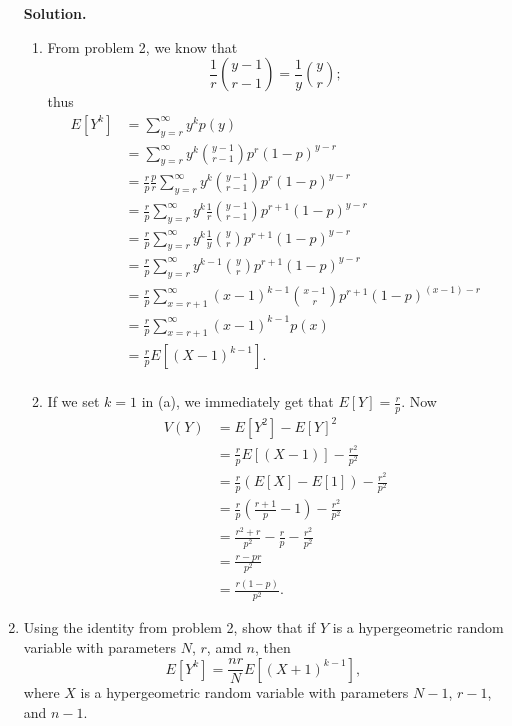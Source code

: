 \documentclass[9pt]{article}
\newcommand{\D}{\displaystyle}
\begin{document}
\begin{enumerate}
      \textbf{Solution.}

      \begin{enumerate}
         \item From problem 2, we know that 
               $$\frac{1}{r}\binom{y-1}{r-1} = \frac{1}{y}\binom{y}{r};$$
               thus
               \begin{align*}
                  E[Y^k] &= \sum_{y=r}^\infty y^kp(y) \\
                         &= \sum_{y=r}^\infty y^k \binom{y-1}{r-1}
                            p^r(1-p)^{y-r} \\
                         &= \frac{r}{p}\frac{p}{r}\sum_{y=r}^\infty
                            y^k \binom{y-1}{r-1} p^r(1-p)^{y-r} \\
                         &= \frac{r}{p}\sum_{y=r}^\infty
                            y^k\frac{1}{r}\binom{y-1}{r-1} p^{r+1}(1-p)^{y-r} \\
                         &= \frac{r}{p}\sum_{y=r}^\infty
                            y^k\frac{1}{y}\binom{y}{r} p^{r+1}(1-p)^{y-r} \\
                         &= \frac{r}{p}\sum_{y=r}^\infty
                            y^{k-1}\binom{y}{r} p^{r+1}(1-p)^{y-r} \\
                         &= \frac{r}{p}\sum_{x=r+1}^\infty
                            (x-1)^{k-1}\binom{x-1}{r} p^{r+1}(1-p)^{(x-1)-r} \\
                         &= \frac{r}{p}\sum_{x=r+1}^\infty (x-1)^{k-1}p(x) \\
                         &= \frac{r}{p}E[(X-1)^{k-1}]. \\
               \end{align*}
         \item If we set $k = 1$ in (a), we immediately get that
               $\D E[Y] = \frac{r}{p}$. Now
               \begin{align*}
                  V(Y) &= E[Y^2] - E[Y]^2 \\
                       &= \frac{r}{p}E[(X-1)] - \frac{r^2}{p^2} \\
                       &= \frac{r}{p}(E[X]- E[1]) - \frac{r^2}{p^2} \\
                       &= \frac{r}{p}\left(\frac{r + 1}{p}- 1\right) -
                          \frac{r^2}{p^2} \\
                       &= \frac{r^2 + r}{p^2}- \frac{r}{p} - \frac{r^2}{p^2} \\
                       &= \frac{r - pr}{p^2} \\
                       &= \frac{r(1 - p)}{p^2}.
               \end{align*}
      \end{enumerate}
   \item Using the identity from problem 2, show that if $Y$ is a hypergeometric
         random variable with parameters $N$, $r$, amd $n$, then
         $$E[Y^k] = \frac{nr}{N}E[(X+1)^{k-1}],$$
         where $X$ is a hypergeometric random variable with parameters $N - 1$,
         $r - 1$, and $n - 1$.


\end{enumerate}
\end{document}
